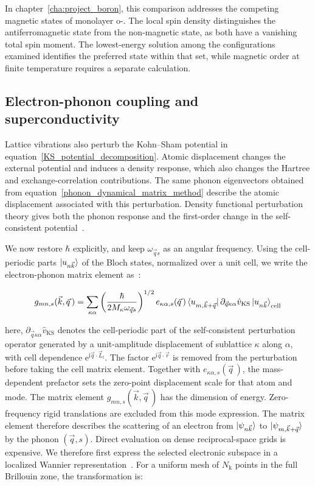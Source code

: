 In chapter~\ref{cha:project_boron},
this comparison addresses the competing magnetic states of monolayer o-.
The local spin density distinguishes the antiferromagnetic state from the non-magnetic state, as both have a vanishing total spin moment.
The lowest-energy solution among the configurations examined identifies the preferred state within that set,
while magnetic order at finite temperature requires a separate calculation.

\subsection{Electron-phonon coupling and superconductivity}
\label{subsec:method_elph}

Lattice vibrations also perturb the Kohn--Sham potential in equation~\eqref{KS_potential_decomposition}.
Atomic displacement changes the external potential and induces a density response,
which also changes the Hartree and exchange-correlation contributions.
The same phonon eigenvectors obtained from equation~\eqref{phonon_dynamical_matrix_method}
describe the atomic displacement associated with this perturbation.
Density functional perturbation theory gives both the phonon response and the first-order change in the self-consistent potential~\cite{baroni2001phonons}.

We now restore $\hbar$ explicitly, and keep $\omega_{\vec{q}s}$ as an angular frequency.
Using the cell-periodic parts $\ket{u_{n\vec{k}}}$ of the Bloch states, normalized over a unit cell,
we write the electron-phonon matrix element as~\cite{giustino2017electron}:

\begin{equation}
    g_{mn,s}(\vec{k},\vec{q}\,)
    =
    \sum_{\kappa\alpha}
    \left(\frac{\hbar}{2M_\kappa\omega_{\vec{q}s}}\right)^{1/2}
    e_{\kappa\alpha,s}(\vec{q}\,)
    \bra{u_{m,\vec{k}+\vec{q}}}
    \partial_{\vec{q}\kappa\alpha}\hat{v}_\mathrm{KS}
    \ket{u_{n\vec{k}}}_\mathrm{cell}
\label{electron_phonon_matrix_element_method}
\end{equation}

here, $\partial_{\vec{q}\kappa\alpha}\hat{v}_\mathrm{KS}$ denotes the cell-periodic part of the self-consistent perturbation operator generated by a unit-amplitude displacement of sublattice $\kappa$ along $\alpha$,
with cell dependence $\mathrm{e}^{\mathrm{i}\vec{q}\cdot\vec{L}_l}$.
The factor $\mathrm{e}^{\mathrm{i}\vec{q}\cdot\vec{r}}$ is removed from the perturbation before taking the cell matrix element.
Together with $e_{\kappa\alpha,s}(\vec{q}\,)$,
the mass-dependent prefactor sets the zero-point displacement scale for that atom and mode.
The matrix element $g_{mn,s}(\vec{k},\vec{q}\,)$ has the dimension of energy.
Zero-frequency rigid translations are excluded from this mode expression.
The matrix element therefore describes the scattering of an electron from $\ket{\psi_{n\vec{k}}}$ to $\ket{\psi_{m,\vec{k}+\vec{q}}}$ by the phonon $(\vec{q},s)$.
Direct evaluation on dense reciprocal-space grids is expensive.
We therefore first express the selected electronic subspace in a localized Wannier representation~\cite{pizzi2020wannier90}.
For a uniform mesh of $N_\mathrm{k}$ points in the full Brillouin zone, the transformation is:

